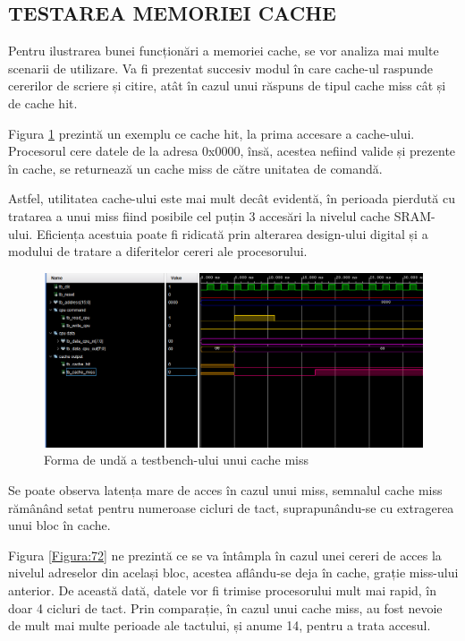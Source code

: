 \documentclass[12pt]{article}
\begin{document}
 \subsection{TESTAREA MEMORIEI CACHE}
 Pentru ilustrarea bunei funcționări a memoriei cache, se vor analiza mai multe scenarii de utilizare. Va fi prezentat succesiv modul în care cache-ul raspunde cererilor de scriere și citire, atât în cazul unui răspuns de tipul cache miss cât și de cache hit.
 

 Figura \ref{Figura:71} prezintă un exemplu ce cache hit, la prima accesare a cache-ului. Procesorul cere datele de la adresa 0x0000, însă, acestea nefiind valide și prezente în cache, se returnează un cache miss de către 
unitatea de comandă.

Astfel, utilitatea cache-ului este mai mult decât evidentă, în perioada pierdută cu tratarea a unui miss fiind posibile cel puțin 3 accesări la nivelul cache SRAM-ului. Eficiența acestuia poate fi ridicată prin alterarea design-ului digital și a modului de tratare a diferitelor cereri ale procesorului.

  \begin{figure}[h!]
 \hspace*{-0.4cm}\includegraphics[width=1\textwidth]{cachemiss1.png}
 \centering
 \caption{Forma de undă a testbench-ului unui cache miss}
 \label{Figura:71}
 \end{figure}
 
Se poate observa latența mare de acces în cazul unui miss, semnalul cache miss rămânând setat pentru numeroase cicluri de tact, suprapunându-se cu extragerea unui bloc în cache.

 Figura \ref{Figura:72} ne prezintă ce se va întâmpla în cazul unei cereri de acces la nivelul adreselor din același bloc, acestea aflându-se deja în cache, grație miss-ului anterior. De această dată, datele vor fi trimise procesorului mult mai rapid, în doar 4 cicluri de tact. Prin comparație, în cazul unui cache miss, au fost nevoie de mult mai multe perioade ale tactului, și anume 14, pentru a trata accesul.
 
\end{document}
